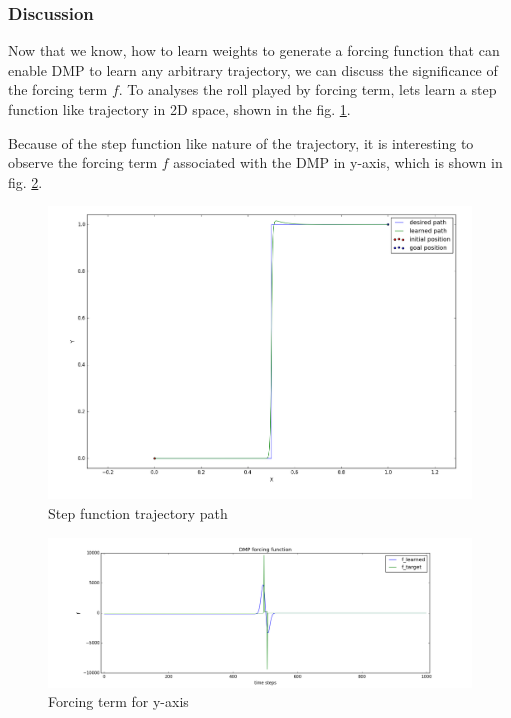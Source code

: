 \subsubsection{Discussion}
Now that we know, how to learn weights to generate a forcing function that can enable DMP to learn any arbitrary trajectory, we can discuss the significance of the forcing term $f$. To analyses the roll played by forcing term, lets learn a step function like trajectory in 2D space, shown in the fig. \ref{fig:step_f}.   

Because of the step function like nature of the trajectory, it is interesting to observe the forcing term $f$ associated with the DMP in y-axis, which is shown in fig. \ref{fig:step_f_y}.
\begin{figure}[H]
	\centering
	\includegraphics[scale=0.35]{images/step_f.png}
	\caption{Step function trajectory path}
	\label{fig:step_f}
\end{figure}



\begin{figure}[H]
	\centering
	\includegraphics[scale=0.38]{images/f_y.png}
	\caption{Forcing term for y-axis}
	\label{fig:step_f_y}
\end{figure}

